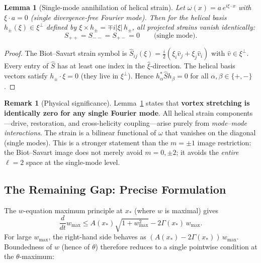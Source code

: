 \documentclass[12pt,a4paper]{article}
\newtheorem{lemma}[theorem]{Lemma}
\theoremstyle{definition}
\newtheorem{remark}[theorem]{Remark}
\begin{document}
\begin{lemma}[Single-mode annihilation of helical strain]\label{lem:annihilation}
Let $\omega(x)=a\,e^{i\xi\cdot x}$ with $\xi\cdot a=0$ (single divergence-free
Fourier mode). Then for the helical basis $h_\pm(\xi)\in\xi^\perp$
defined by $\xi\times h_\pm=\mp i|\xi|\,h_\pm$, all projected strains
vanish identically:
\begin{equation}\label{eq:annihilation}
\boxed{S_{++}=S_{--}=S_{+-}=0 \qquad\text{(single mode).}}
\end{equation}
\end{lemma}

\begin{proof}
The Biot--Savart strain symbol is
$\hat{S}_{ij}(\xi)=\frac{i}{2}(\xi_i\hat{v}_j+\xi_j\hat{v}_i)$
with $\hat{v}\in\xi^\perp$. Every entry of $\hat{S}$ has at least one
index in the $\hat{\xi}$-direction. The helical basis vectors satisfy
$h_\pm\cdot\xi=0$ (they live in $\xi^\perp$). Hence
$h_\alpha^*\hat{S}h_\beta=0$ for all $\alpha,\beta\in\{+,-\}$.
\end{proof}

\begin{remark}[Physical significance]
Lemma~\ref{lem:annihilation} states that
\textbf{vortex stretching is identically zero for any single Fourier mode}.
All helical strain components---drive, restoration, and
cross-helicity coupling---arise purely from \emph{mode--mode interactions}.
The strain is a bilinear functional of $\omega$
that vanishes on the diagonal (single modes).
This is a stronger statement than the $m=\pm1$ image restriction:
the Biot--Savart image does not merely avoid $m=0,\pm2$;
it avoids the \emph{entire} $\ell=2$ space at the single-mode level.
\end{remark}

\subsection{The Remaining Gap: Precise Formulation}

The $w$-equation maximum principle at $x_*$ (where $w$ is maximal) gives
\begin{equation}
\frac{d}{dt}w_{\max}\le A(x_*)\sqrt{1+w_{\max}^2}-2\Gamma(x_*)\,w_{\max}.
\end{equation}
For large $w_{\max}$, the right-hand side behaves as
$(A(x_*)-2\Gamma(x_*))\,w_{\max}$.
Boundedness of $w$ (hence of $\theta$) therefore reduces to a single
pointwise condition at the $\theta$-maximum:
\end{document}
